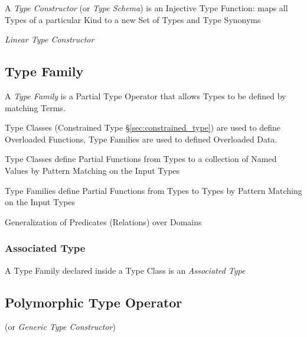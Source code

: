 A \emph{Type Constructor} (or \emph{Type Schema}) is an Injective Type
Function: maps all Types of a particular Kind to a new Set of Types
and Type Synonyms

\emph{Linear Type Constructor} %



\subsection{Type Family}\label{sec:type_family}

A \emph{Type Family} is a Partial Type Operator that allows Types to
be defined by matching Terms.


Type Classes (Constrained Type \S\ref{sec:constrained_type}) are used
to define Overloaded Functions, Type Families are used to defined
Overloaded Data.

Type Classes define Partial Functions from Types to a collection of
Named Values by Pattern Matching on the Input Types

Type Families define Partial Functions from Types to Types by Pattern
Matching on the Input Types

Generalization of Predicates (Relations) over Domains



\subsubsection{Associated Type}\label{sec:associated_type}

A Type Family declared inside a Type Class is an \emph{Associated
  Type}



\subsection{Polymorphic Type Operator}
\label{sec:polymorphic_type_operator}

(or \emph{Generic Type Constructor})



